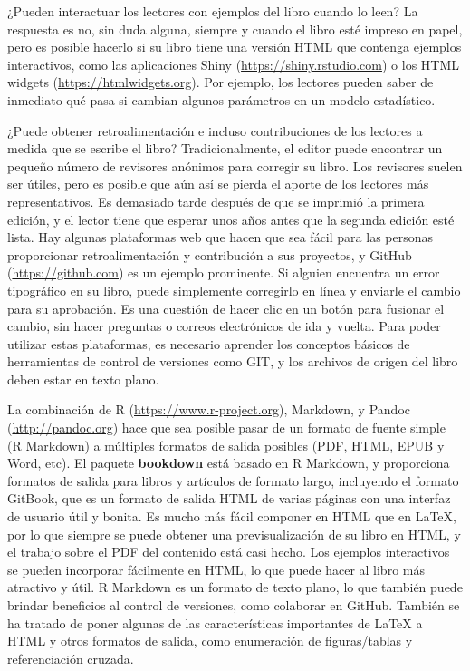 \documentclass[12pt,]{krantz}
\theoremstyle{definition}
\theoremstyle{definition}
\theoremstyle{definition}
\theoremstyle{remark}
\begin{document}
¿Pueden interactuar los lectores con ejemplos del libro cuando lo leen?
La respuesta es no, sin duda alguna, siempre y cuando el libro esté
impreso en papel, pero es posible hacerlo si su libro tiene una versión
HTML que contenga ejemplos interactivos, como las aplicaciones Shiny
(\url{https://shiny.rstudio.com}) o los HTML widgets
(\url{https://htmlwidgets.org}). Por ejemplo, los lectores pueden saber
de inmediato qué pasa si cambian algunos parámetros en un modelo
estadístico.

¿Puede obtener retroalimentación e incluso contribuciones de los
lectores a medida que se escribe el libro? Tradicionalmente, el editor
puede encontrar un pequeño número de revisores anónimos para corregir su
libro. Los revisores suelen ser útiles, pero es posible que aún así se
pierda el aporte de los lectores más representativos. Es demasiado tarde
después de que se imprimió la primera edición, y el lector tiene que
esperar unos años antes que la segunda edición esté lista. Hay algunas
plataformas web que hacen que sea fácil para las personas proporcionar
retroalimentación y contribución a sus proyectos, y GitHub
(\url{https://github.com}) es un ejemplo prominente. Si alguien
encuentra un error tipográfico en su libro, puede simplemente corregirlo
en línea y enviarle el cambio para su aprobación. Es una cuestión de
hacer clic en un botón para fusionar el cambio, sin hacer preguntas o
correos electrónicos de ida y vuelta. Para poder utilizar estas
plataformas, es necesario aprender los conceptos básicos de herramientas
de control de versiones como GIT, y los archivos de origen del libro
deben estar en texto plano.

La combinación de R (\url{https://www.r-project.org}), Markdown, y
Pandoc (\url{http://pandoc.org}) hace que sea posible pasar de un
formato de fuente simple (R Markdown) a múltiples formatos de salida
posibles (PDF, HTML, EPUB y Word, etc). El paquete \textbf{bookdown}
está basado en R Markdown, y proporciona formatos de salida para libros
y artículos de formato largo, incluyendo el formato GitBook, que es un
formato de salida HTML de varias páginas con una interfaz de usuario
útil y bonita. Es mucho más fácil componer en HTML que en LaTeX, por lo
que siempre se puede obtener una previsualización de su libro en HTML, y
el trabajo sobre el PDF del contenido está casi hecho. Los ejemplos
interactivos se pueden incorporar fácilmente en HTML, lo que puede hacer
al libro más atractivo y útil. R Markdown es un formato de texto plano,
lo que también puede brindar beneficios al control de versiones, como
colaborar en GitHub. También se ha tratado de poner algunas de las
características importantes de LaTeX a HTML y otros formatos de salida,
como enumeración de figuras/tablas y referenciación cruzada.
\end{document}
